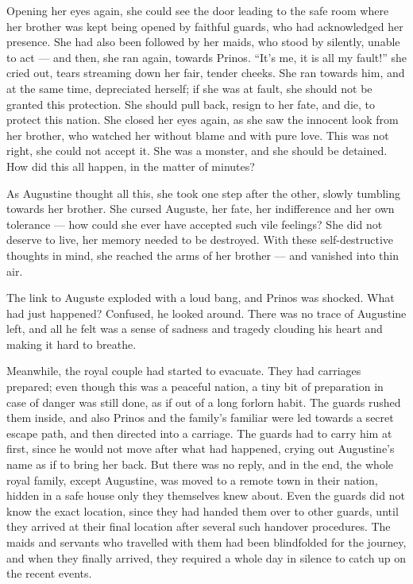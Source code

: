 Opening her eyes again, she could see the door leading to the safe room where her brother was kept being opened by faithful guards, who had acknowledged her presence. She had also been followed by her maids, who stood by silently, unable to act --- and then, she ran again, towards Prinos. \enquote{It's me, it is all my fault!} she cried out, tears streaming down her fair, tender cheeks. She ran towards him, and at the same time, depreciated herself; if she was at fault, she should not be granted this protection. She should pull back, resign to her fate, and die, to protect this nation. She closed her eyes again, as she saw the innocent look from her brother, who watched her without blame and with pure love. This was not right, she could not accept it. She was a monster, and she should be detained. How did this all happen, in the matter of minutes?

As Augustine thought all this, she took one step after the other, slowly tumbling towards her brother. She cursed Auguste, her fate, her indifference and her own tolerance --- how could she ever have accepted such vile feelings? She did not deserve to live, her memory needed to be destroyed. With these self-destructive thoughts in mind, she reached the arms of her brother --- and vanished into thin air.

The link to Auguste exploded with a loud bang, and Prinos was shocked. What had just happened? Confused, he looked around. There was no trace of Augustine left, and all he felt was a sense of sadness and tragedy clouding his heart and making it hard to breathe.

Meanwhile, the royal couple had started to evacuate. They had carriages prepared; even though this was a peaceful nation, a tiny bit of preparation in case of danger was still done, as if out of a long forlorn habit. The guards rushed them inside, and also Prinos and the family's familiar were led towards a secret escape path, and then directed into a carriage. The guards had to carry him at first, since he would not move after what had happened, crying out Augustine's name as if to bring her back. But there was no reply, and in the end, the whole royal family, except Augustine, was moved to a remote town in their nation, hidden in a safe house only they themselves knew about. Even the guards did not know the exact location, since they had handed them over to other guards, until they arrived at their final location after several such handover procedures. The maids and servants who travelled with them had been blindfolded for the journey, and when they finally arrived, they required a whole day in silence to catch up on the recent events.

